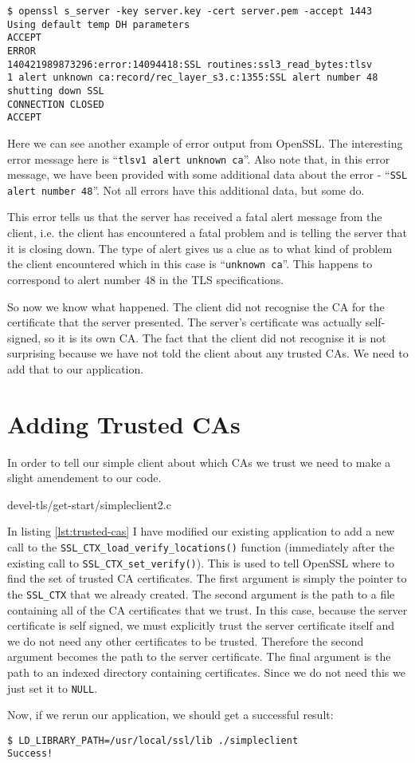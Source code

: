 \begin{verbatim}
$ openssl s_server -key server.key -cert server.pem -accept 1443
Using default temp DH parameters
ACCEPT
ERROR
140421989873296:error:14094418:SSL routines:ssl3_read_bytes:tlsv
1 alert unknown ca:record/rec_layer_s3.c:1355:SSL alert number 48
shutting down SSL
CONNECTION CLOSED
ACCEPT
\end{verbatim}

Here we can see another example of error output from OpenSSL. The interesting 
error message here is ``\verb!tlsv1 alert unknown ca!''. Also note that, in 
this error message, we have been provided with some additional data about the 
error - ``\verb!SSL alert number 48!''. Not all errors have this additional 
data, but some do.

This error tells us that the server has received a fatal alert message from the 
client, i.e. the client has encountered a fatal problem and is telling the 
server that it is closing down. The type of alert gives us a clue as to what 
kind of problem the client encountered which in this case is
``\verb!unknown ca!''. This happens to correspond to alert number 48 in the TLS 
specifications.

So now we know what happened. The client did not recognise the CA for the 
certificate that the server presented. The server's certificate was actually 
self-signed, so it is its own CA. The fact that the client did not recognise it 
is not surprising because we have not told the client about any trusted CAs. We 
need to add that to our application.

\section{Adding Trusted CAs}

In order to tell our simple client about which CAs we trust we need to make a 
slight amendement to our code.


{devel-tls/get-start/simpleclient2.c}

In listing \ref{lst:trusted-cas} I have modified our existing application to add
a new call to the \verb!SSL_CTX_load_verify_locations()! function (immediately
after the existing call to \verb!SSL_CTX_set_verify()!). This is used to tell 
OpenSSL where to find the set of trusted CA certificates. The first argument is
simply the pointer to the \verb!SSL_CTX! that we already created. The second
argument is the path to a file containing all of the CA certificates that we
trust. In this case, because the server certificate is self signed, we must
explicitly trust the server certificate itself and we do not need any other
certificates to be trusted. Therefore the second argument becomes the path to 
the server certificate. The final argument is the path to an indexed directory 
containing certificates. Since we do not need this we just set it to 
\verb!NULL!.

Now, if we rerun our application, we should get a successful result:

\begin{verbatim}
$ LD_LIBRARY_PATH=/usr/local/ssl/lib ./simpleclient
Success!
\end{verbatim}
